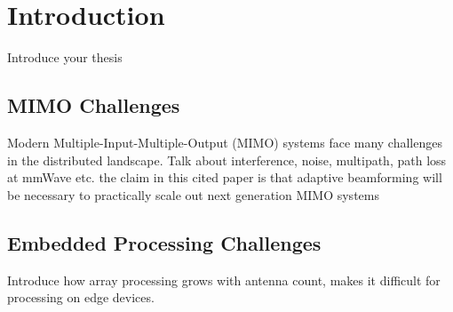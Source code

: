 \chapter{Introduction}
\label{chap:intro}

Introduce your thesis

\section{MIMO Challenges}

Modern Multiple-Input-Multiple-Output (MIMO) systems face many challenges in the distributed landscape. Talk about interference, noise, multipath, path loss at mmWave etc. the claim in this cited paper is that adaptive beamforming will be necessary to practically scale out next generation MIMO systems\citep{6732923}

\section{Embedded Processing Challenges}

Introduce how array processing grows with antenna count, makes it difficult for processing on edge devices.
